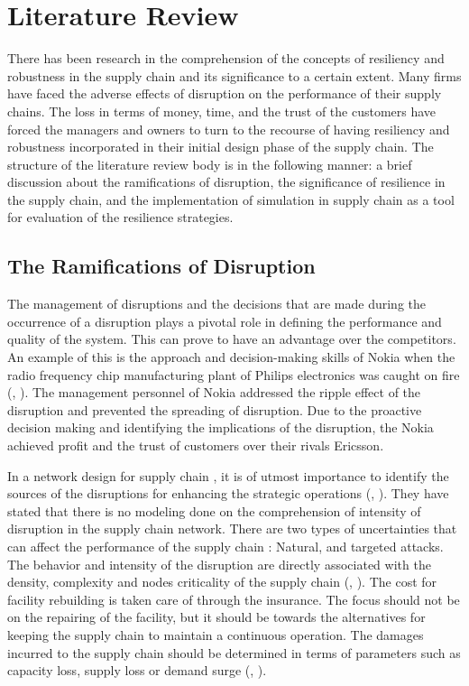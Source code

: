 \chapter{Literature Review} \label{ch:litreview}

There has been research in the comprehension of the concepts of resiliency and robustness in the supply chain and its significance to a certain extent. Many firms have faced the adverse effects of disruption on the performance of their supply chains. The loss in terms of money, time, and the trust of the customers have forced the managers and owners to turn to the recourse of having resiliency and robustness incorporated in their initial design phase of the supply chain. The structure of the literature review body is in the following manner: a brief discussion about the ramifications of disruption, the significance of resilience in the supply chain, and the implementation of simulation in supply chain as a tool for evaluation of the resilience strategies.
\section{The Ramifications of Disruption}
The management of disruptions and the decisions that are made during the occurrence of a disruption plays a pivotal role in defining the performance and quality of the system. This can prove to have an advantage over the competitors. An example of this is the approach and decision-making skills of Nokia when the radio frequency chip manufacturing plant of Philips electronics was caught on fire (\citeauthor{latour2001trial}, \citeyear{latour2001trial}). The management personnel of Nokia addressed the ripple effect of the disruption and prevented the spreading of disruption. Due to the proactive decision making and identifying the implications of the disruption, the Nokia achieved profit and the trust of customers over their rivals Ericsson. 

In a network design for supply chain , it is of utmost importance to identify the sources of the disruptions  for enhancing the strategic operations (\citeauthor{klibi2010design}, \citeyear{klibi2010design}). They have stated that there is no modeling done on the comprehension of intensity of disruption in the supply chain network. There are two types of uncertainties that can affect the performance of the supply chain : Natural, and targeted attacks. The behavior and intensity of the disruption are directly associated with the density, complexity and nodes criticality of the supply chain (\citeauthor{craighead2007severity}, \citeyear{craighead2007severity}). The cost for facility rebuilding is taken care of through the insurance. The focus should not be on the repairing of the facility, but it should be towards the alternatives for keeping the supply chain to maintain a continuous operation. The damages incurred to the supply chain should be determined in terms of parameters such as capacity loss, supply loss or demand surge (\citeauthor{sheffi2005resilient}, \citeyear{sheffi2005resilient}).

